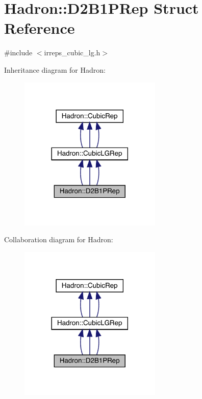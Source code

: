 \hypertarget{structHadron_1_1D2B1PRep}{}\section{Hadron\+:\+:D2\+B1\+P\+Rep Struct Reference}
\label{structHadron_1_1D2B1PRep}


{\ttfamily \#include $<$irreps\+\_\+cubic\+\_\+lg.\+h$>$}



Inheritance diagram for Hadron\+:
\nopagebreak
\begin{figure}[H]
\begin{center}
\leavevmode
\includegraphics[width=192pt]{d2/d80/structHadron_1_1D2B1PRep__inherit__graph}
\end{center}
\end{figure}


Collaboration diagram for Hadron\+:
\nopagebreak
\begin{figure}[H]
\begin{center}
\leavevmode
\includegraphics[width=192pt]{dc/d9c/structHadron_1_1D2B1PRep__coll__graph}
\end{center}
\end{figure}
